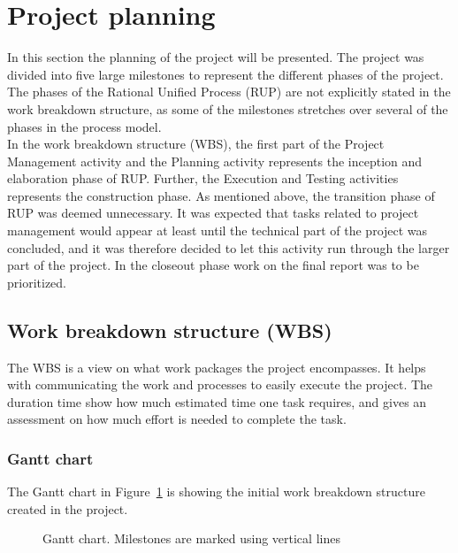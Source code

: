 \section{Project planning}
\label{projectplanning}
In this section the planning of the project will be presented. The project was divided into five large milestones to represent the different phases of the project. The phases of the Rational Unified Process (RUP) are not explicitly stated in the work breakdown structure, as some of the milestones stretches over several of the phases in the process model. \\
\newline
In the work breakdown structure (WBS), the first part of the Project Management activity and the Planning activity represents the inception and elaboration phase of RUP. Further, the Execution and Testing activities represents the construction phase. As mentioned above, the transition phase of RUP was deemed unnecessary. It was expected that tasks related to project management would appear at least until the technical part of the project was concluded, and it was therefore decided to let this activity run through the larger part of the project. In the closeout phase work on the final report was to be prioritized.

\subsection{Work breakdown structure (WBS)}
The WBS is a view on what work packages the project encompasses. It helps with communicating the work and processes to easily execute the project. The duration time show how much estimated time one task requires, and gives an assessment on how much effort is needed to complete the task.

\subsubsection{Gantt chart}
The Gantt chart in Figure~\ref{fig:gantt} is showing the initial work breakdown structure created in the project.
\begin{figure}[H]
\label{fig:gantt}
\caption[Gant chart]{Gantt chart. Milestones are marked using vertical lines}
\end{figure}
\newpage
